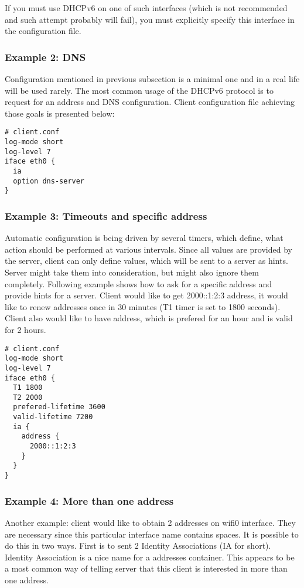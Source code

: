 If you must use DHCPv6 on one of such interfaces (which is not
recommended and such attempt probably will fail), you must explicitly
specify this interface in the configuration file.

\subsubsection{Example 2: DNS}
Configuration mentioned in previous subsection is a minimal one and in a
real life will be used rarely. The most common usage of the DHCPv6
protocol is to request for an address and DNS configuration. Client
configuration file achieving those goals is presented below:
\begin{lstlisting}
# client.conf
log-mode short
log-level 7
iface eth0 {
  ia
  option dns-server
}
\end{lstlisting}

\subsubsection{Example 3: Timeouts and specific address}

Automatic configuration is being driven by several timers, which define,
what action should be performed at various intervals. Since all
values are provided by the server, client can only define values, which
will be sent to a server as hints. Server might take them into
consideration, but might also ignore them
completely. Following example shows how to ask for a specific address
and provide hints for a server. Client would like to get 2000::1:2:3
address, it would like to renew addresses once in 30 minutes (T1 timer
is set to 1800 seconds). Client also would like to have address, which
is prefered for an hour and is valid for 2 hours.

\begin{lstlisting}
# client.conf
log-mode short
log-level 7
iface eth0 {
  T1 1800
  T2 2000
  prefered-lifetime 3600
  valid-lifetime 7200
  ia {
    address {
      2000::1:2:3
    }
  }
}
\end{lstlisting}

\subsubsection{Example 4: More than one address}

Another example: client would like to obtain 2 addresses on
wifi0 interface. They are necessary since this particular interface name
contains spaces. It is possible to do this in two ways. First is to
sent 2 Identity Associations (IA for short). Identity Association is a
nice name for a addresses container. This appears to be a most common
way of telling server that this client is interested in more than one
address.

